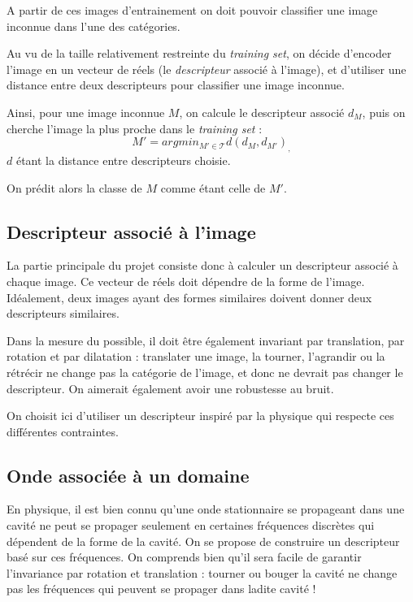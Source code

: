 \documentclass[a4paper,10pt]{article} %
\theoremstyle{definition} %
\begin{document}
A partir de ces images d'entrainement on doit pouvoir classifier une image inconnue dans l'une des catégories.

Au vu de la taille relativement restreinte du \textit{training set}, on décide d'encoder l'image en un vecteur de réels (le \textit{descripteur} associé à l'image), et d'utiliser 
une distance entre deux descripteurs pour classifier une image inconnue.

Ainsi, pour une image inconnue $M$, on calcule le descripteur associé $d_M$, puis on cherche l'image la plus proche dans le \textit{training set} : $$M' = argmin_{M' \in \mathcal{T}}{d(d_M, d_{M'})}_,   $$ $d$ étant la distance entre descripteurs choisie.

On prédit alors la classe de $M$ comme étant celle de $M'$.


\subsection{Descripteur associé à l'image}

La partie principale du projet consiste donc à calculer un descripteur associé à chaque image. Ce vecteur de réels doit dépendre de la forme de l'image. Idéalement, deux images ayant des formes similaires doivent donner deux descripteurs similaires.

Dans la mesure du possible, il doit être également invariant par translation, par rotation et par dilatation : translater une image, la tourner, l'agrandir ou la rétrécir ne change pas la catégorie de l'image, et donc ne devrait pas changer le descripteur. On aimerait également avoir une robustesse au bruit.

On choisit ici d'utiliser un descripteur inspiré par la physique qui respecte ces différentes contraintes.

\subsection*{Onde associée à un domaine}

En physique, il est bien connu qu'une onde stationnaire se propageant dans une cavité ne peut se propager seulement en certaines fréquences discrètes qui dépendent de la forme de la cavité.
On se propose de construire un descripteur basé sur ces fréquences. On comprends bien qu'il sera facile de garantir l'invariance par rotation et translation : tourner ou bouger la cavité ne change pas les fréquences qui peuvent se propager dans ladite cavité !
\end{document}
